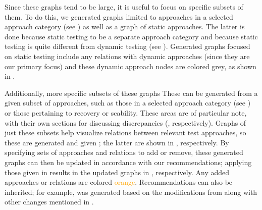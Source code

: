 \fi
Since these graphs tend to be large, it is useful to focus on specific
subsets of them. \ifnotpaper To do this, we generated graphs limited to
    approaches in a selected approach category (see )
    as well as a graph of static approaches. The latter is done because
    \citet[Fig.~2]{IEEE2022}  static testing to be a
    separate approach category and because static testing is quite different
    from dynamic testing (see ). Generated graphs focused
    on static testing include any relations with dynamic approaches (since
    they are our primary focus) and these dynamic approach nodes are
    colored grey, as shown in .

    Additionally, more specific subsets of these graphs \else These \fi
can be generated from a given subset of approaches, such as
\ifnotpaper\else those in a selected approach category (see
    ) or \fi those pertaining to recovery or
scability\ifnotpaper. These areas are of particular note, with their own
sections for discussing discrepancies (,
respectively). Graphs of just these subsets help visualize relations
between relevant test approaches, so these are generated and given
\else; the latter are shown \fi in , respectively. By specifying sets of approaches
and relations to add or remove,
these generated graphs can then be updated in accordance with our
recommendations; applying those given in  results in the updated graphs in
, respectively. Any added approaches or relations are
colored \textcolor{orange}{orange}.
\ifnotpaper
    Recommendations can also be inherited; for example,
     was generated based on the modifications from
     along with
    other changes mentioned in .
\fi

\ifnotpaper
    
\else
    \sntxDiscrepsTable{}
    \smntcDiscrepsTable{}
\fi
